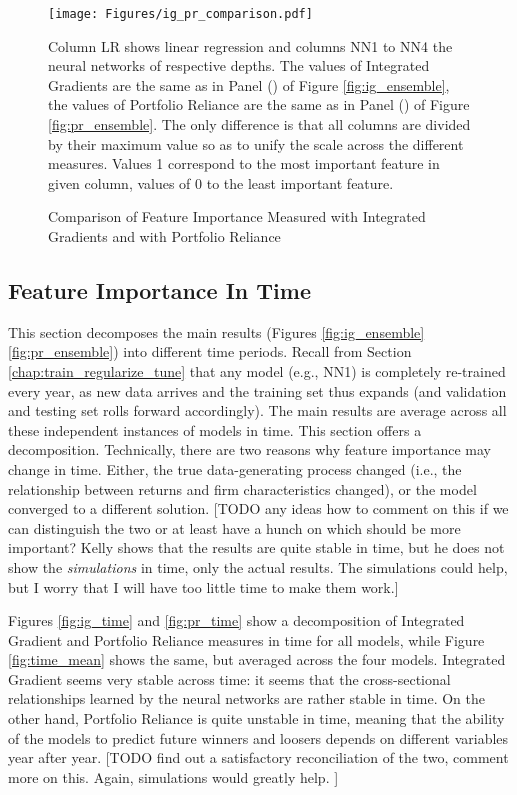 {	\begin{figure}
		\centering
		\texttt{[image: Figures/ig\_pr\_comparison.pdf]}
		\caption{Comparison of Feature Importance Measured with Integrated Gradients and with Portfolio Reliance}
		\label{fig:ig_pr_comparison}
		\medskip
		\small 
		Column LR shows linear regression and columns NN1 to NN4 the neural networks of respective depths. The values of Integrated Gradients are the same as in Panel () of Figure \ref{fig:ig_ensemble}, the values of Portfolio Reliance are the same as in Panel () of Figure \ref{fig:pr_ensemble}. The only difference is that all columns are divided by their maximum value so as to unify the scale across the different measures. Values 1 correspond to the most important feature in given column, values of 0 to the least important feature. 
	\end{figure}
	
	 

	
	\subsection{Feature Importance In Time}
	
		This section decomposes the main results (Figures \ref{fig:ig_ensemble} \ref{fig:pr_ensemble}) into different time periods. Recall from Section \ref{chap:train_regularize_tune} that any model (e.g., NN1) is completely re-trained every year, as new data arrives and the training set thus expands (and validation and testing set rolls forward accordingly). The main results are average across all these independent instances of models in time. This section offers a decomposition. Technically, there are two reasons why feature importance may change in time. Either, the true data-generating process changed (i.e., the relationship between returns and firm characteristics changed), or the model converged to a different solution. [TODO any ideas how to comment on this if we can distinguish the two or at least have a hunch on which should be more important? Kelly shows that the results are quite stable in time, but he does not show the \textit{simulations} in time, only the actual results. The simulations could help, but I worry that I will have too little time to make them work.] 
		
		Figures \ref{fig:ig_time} and \ref{fig:pr_time} show a decomposition of Integrated Gradient and Portfolio Reliance measures in time for all models, while Figure \ref{fig:time_mean} shows the same, but averaged across the four models. Integrated Gradient seems very stable across time: it seems that the cross-sectional relationships learned by the neural networks are rather stable in time. On the other hand, Portfolio Reliance is quite unstable in time, meaning that the ability of the models to predict future winners and loosers depends on different variables year after year. [TODO find out a satisfactory reconciliation of the two, comment more on this. Again, simulations would greatly help. ]
	
}
